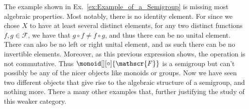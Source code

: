    The example shown in Ex.~\ref{ex:Example_of_a_Semigroup} is missing most
    algebraic properties. Most notably, there is no identity element. For since
    we chose $X$ to have at least several distinct elements, for any two
    distinct functions $f,g\in\mathscr{F}$, we have that
    $g\circ{f}\ne{f}\circ{g}$, and thus there can be no unital element. There
    can also be no left or right unital element,
    and as such there can be no invertible elements. Moreover, as this previous
    expression shows, the operation is not commutative. Thus
    $\monoid[][\circ]{\mathscr{F}}$ is a semigroup but can't possibly be any of
    the nicer objects like monoids or groups. Now we have seen two different
    objects that give rise to the algebraic structure of a semigroup, and
    nothing more. There a many other examples that, further justifying the study
    of this weaker category.
